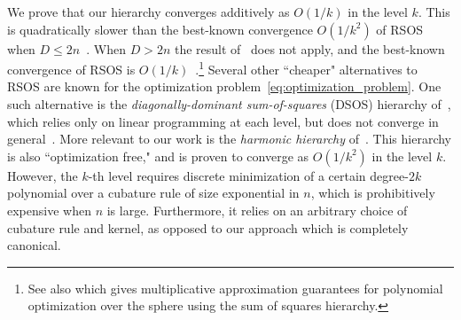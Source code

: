 \documentclass[11pt]{article}
\numberwithin{theorem}{section}
\theoremstyle{definition}
\begin{document}




We prove that our hierarchy converges additively as $O(1/k)$ in the level $k$. This is quadratically slower than the best-known convergence $O(1/k^2)$ of RSOS when $D\leq 2n$~\cite{fang2021sum}. When $D > 2n$ the result of~\cite{fang2021sum} does not apply, and the best-known convergence of RSOS is $O(1/k)$~\cite{reznick1995uniform, doherty2012convergence}.\footnote{See also \cite{BhattiproluGGLT17} which gives multiplicative approximation guarantees for polynomial optimization over the sphere using the sum of squares hierarchy.} Several other ``cheaper" alternatives to RSOS are known for the optimization problem~\eqref{eq:optimization_problem}. One such alternative is the \textit{diagonally-dominant sum-of-squares} (DSOS) hierarchy of~\cite{AM19}, which relies only on linear programming at each level, but does not converge in general~\cite[Proposition 3.15]{AM19}. More relevant to our work is the \textit{harmonic hierarchy} of~\cite{cristancho2024harmonic}. This hierarchy is also ``optimization free," and is proven to converge as $O(1/k^2)$ in the level $k$. However, the $k$-th level requires discrete minimization of a certain degree-$2k$ polynomial over a cubature rule of size exponential in $n$, which is prohibitively expensive when $n$ is large. Furthermore, it relies on an arbitrary choice of cubature rule and kernel, as opposed to our approach which is completely canonical.


\end{document}

